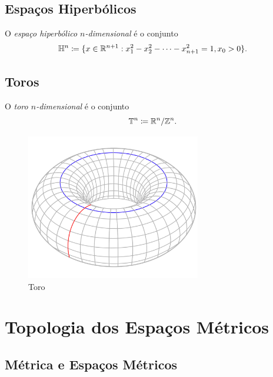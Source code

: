 \section{Espaços Hiperbólicos}

\begin{defi}
	O \emph{espaço hiperbólico $n$-dimensional} é o conjunto
	\begin{equation*}
	\mathbb{H}^n \coloneqq \{x \in \mathbb{R}^{n+1}: x_1^2-x_2^2-\cdots -x_{n+1}^2=1,\\ x_0>0 \}.
	\end{equation*}
\end{defi}

\section{Toros}

\begin{defi}
	O \emph{toro $n$-dimensional} é o conjunto
	\begin{equation*}
	\mathbb{T}^n \coloneqq \mathbb{R}^n / \mathbb{Z}^n.
	\end{equation*}
\end{defi}

\begin{figure}[!h]
\centering
\includegraphics[width=3in]{./imagens/toro}
\caption{Toro}
\end{figure}


\chapter{Topologia dos Espaços Métricos}

\section{Métrica e Espaços Métricos}

